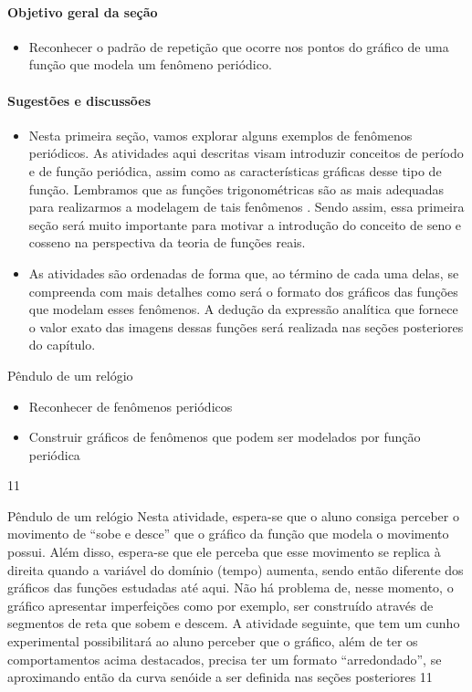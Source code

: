 \def\currentcolor{session1}
\begin{texto}
{
	\paragraph{Objetivo geral da seção}
	\begin{itemize}
	\item Reconhecer o padrão de repetição que ocorre nos pontos do
	gráfico de uma função que modela um fenômeno periódico.
	\end{itemize}


	\paragraph{Sugestões e discussões}
	\begin{itemize}
	\item Nesta primeira seção, vamos explorar alguns exemplos de
	fenômenos periódicos. As atividades aqui descritas visam
	introduzir conceitos de período e de função periódica, assim
	como as características gráficas desse tipo de função.
	Lembramos que as funções trigonométricas são as mais
	adequadas para realizarmos a modelagem de tais fenômenos
	\citep{Lima2006}. Sendo assim, essa primeira seção será
	muito importante para motivar a introdução do conceito de
	seno e cosseno na perspectiva da teoria de funções reais.
	\item As atividades são ordenadas de forma que, ao término de
	cada uma delas, se compreenda com mais detalhes como será
	o formato dos gráficos das funções que modelam esses
	fenômenos. A dedução da expressão analítica que fornece o
	valor exato das imagens dessas funções será realizada nas
	seções posteriores do capítulo.
	\end{itemize}
}
\end{texto}
\begin{objectives}{Pêndulo de um relógio}
{
\begin{itemize}
\item Reconhecer de fenômenos periódicos
\item Construir gráficos de fenômenos que podem ser modelados
por função periódica
\end{itemize}
}{1}{1}
\end{objectives}
\begin{sugestions}{Pêndulo de um relógio}
{
Nesta atividade, espera-se que o aluno consiga perceber o
movimento de “sobe e desce”{} que o gráfico da função que
modela o movimento possui. Além disso, espera-se que ele
perceba que esse movimento se replica à direita quando a
variável do domínio (tempo) aumenta, sendo então diferente
dos gráficos das funções estudadas até aqui. Não há problema
de, nesse momento, o gráfico apresentar imperfeições como
por exemplo, ser construído através de segmentos de reta que
sobem e descem. A atividade seguinte, que tem um cunho
experimental possibilitará ao aluno perceber que o gráfico,
além de ter os comportamentos acima destacados, precisa ter
um formato “arredondado”, se aproximando então da curva
senóide a ser definida nas seções posteriores
}{1}{1}
\end{sugestions}
